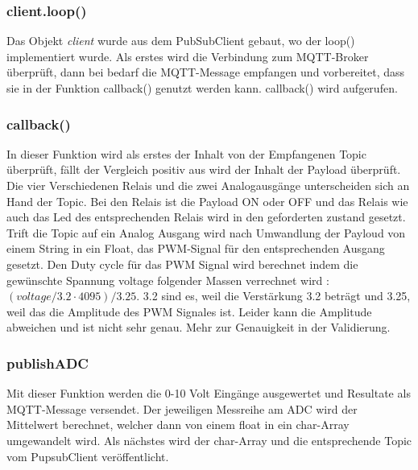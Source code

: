 \subsubsection{client.loop()}
 Das Objekt \textit{client} wurde aus dem PubSubClient gebaut, wo der loop() implementiert wurde. Als erstes wird die Verbindung zum MQTT-Broker überprüft, dann bei bedarf die MQTT-Message empfangen und vorbereitet, dass sie in der Funktion callback()  genutzt werden kann. callback() wird aufgerufen.
 \subsubsection{callback()}
 In dieser Funktion wird als erstes der Inhalt von der Empfangenen Topic überprüft, fällt der Vergleich positiv aus wird der Inhalt der Payload überprüft. Die vier Verschiedenen Relais und die zwei Analogausgänge unterscheiden sich an Hand der Topic. Bei den Relais ist die Payload ON oder OFF und das Relais wie auch das Led des entsprechenden Relais wird in den geforderten zustand gesetzt. Trift die Topic auf ein Analog Ausgang wird nach Umwandlung der Payloud von einem String in ein Float, das PWM-Signal für den entsprechenden Ausgang gesetzt. Den Duty cycle für das PWM Signal wird berechnet indem die gewünschte Spannung voltage folgender Massen verrechnet wird : $(voltage/3.2 \cdot 4095)/3.25$. 3.2 sind es, weil die Verstärkung 3.2 beträgt und 3.25, weil das die Amplitude des PWM Signales ist. Leider kann die Amplitude abweichen und ist nicht sehr genau. Mehr zur Genauigkeit in der Validierung.
 
 \subsubsection{publishADC}
Mit dieser Funktion werden die 0-10 Volt Eingänge ausgewertet und Resultate als MQTT-Message versendet. Der jeweiligen Messreihe am ADC wird der Mittelwert berechnet, welcher dann von einem float in ein char-Array umgewandelt wird. Als nächstes wird der char-Array und die entsprechende Topic vom PupsubClient veröffentlicht.


\newpage

